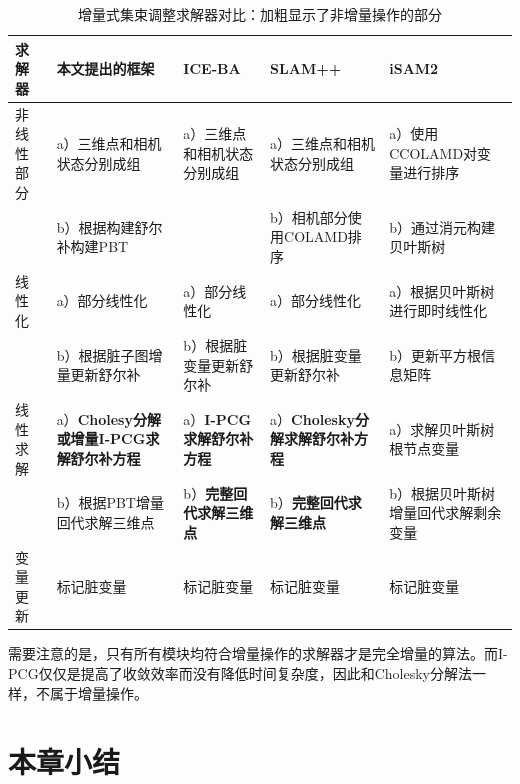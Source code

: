 {
\linespread{1}
\begin{table}[H]
\caption{增量式集束调整求解器对比：加粗显示了非增量操作的部分}
\label{tab:comp}
\centering
\begin{tabular}{l|p{} p{} p{} p{}}
    \toprule
    求解器     & 本文提出的框架
               & ICE-BA
               & SLAM++
               & iSAM2
               \\ \midrule
    非线性部分 & a）三维点和相机状态分别成组
               & a）三维点和相机状态分别成组
               & a）三维点和相机状态分别成组
               & a）使用CCOLAMD对变量进行排序
               \\
               & b）根据构建舒尔补构建PBT
               &
               & b）相机部分使用COLAMD排序
               & b）通过消元构建贝叶斯树
               \\ \midrule
    线性化     & a）部分线性化
               & a）部分线性化
               & a）部分线性化
               & a）根据贝叶斯树进行即时线性化
               \\
               & b）根据脏子图增量更新舒尔补
               & b）根据脏变量更新舒尔补
               & b）根据脏变量更新舒尔补
               & b）更新平方根信息矩阵
               \\ \midrule
    线性求解   & a）\textbf{Cholesy分解或增量I-PCG求解舒尔补方程}
               & a）\textbf{I-PCG求解舒尔补方程}
               & a）\textbf{Cholesky分解求解舒尔补方程}
               & a）求解贝叶斯树根节点变量
               \\
               & b）根据PBT增量回代求解三维点
               & b）\textbf{完整回代求解三维点}
               & b）\textbf{完整回代求解三维点}
               & b）根据贝叶斯树增量回代求解剩余变量
               \\ \midrule
    变量更新   & 标记脏变量
               & 标记脏变量
               & 标记脏变量
               & 标记脏变量
               \\
    \bottomrule
\end{tabular}
\end{table}
}

需要注意的是，只有所有模块均符合增量操作的求解器才是完全增量的算法。而I-PCG仅仅是提高了收敛效率而没有降低时间复杂度，因此和Cholesky分解法一样，不属于增量操作。

\section{本章小结}

